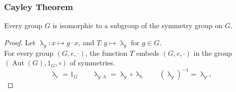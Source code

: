 \documentclass[UTF8,11pt,colorlinks,compress,openany]{beamer}%
\begin{document}
\begin{frame}\frametitle{Cayley Theorem}
\begin{theorem}
Every group $G$ is isomorphic to a subgroup of the symmetry group on $G$.
\end{theorem}
\begin{proof}
Let $\uplambda_g: x\mapsto g\cdot x$, and $T: g\mapsto \uplambda_g$ for $g\in G$.\\
For every group $(G,e,\cdot)$, the function $T$ embeds $(G,e,\cdot)$ in the group $\left(\operatorname{Aut}(G),1_G,\circ\right)$ of symmetries.
\[\uplambda_e=1_G\qquad \uplambda_{g\cdot h}=\uplambda_g\circ \uplambda_h\qquad (\uplambda_g)^{-1}=\uplambda_{g^{-1}}\]
\end{proof}
\end{frame}
\end{document}
